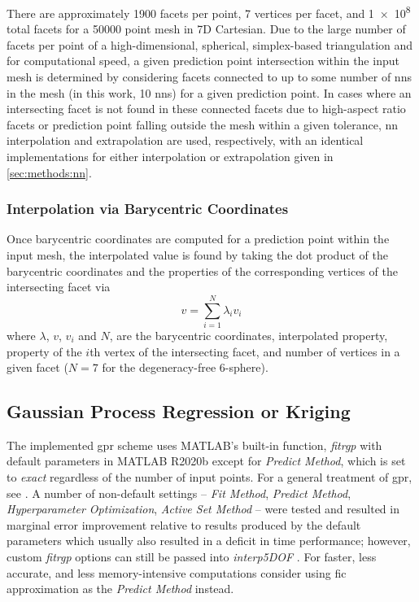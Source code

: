 \documentclass[preprint,12pt]{elsarticle}
\begin{document}
There are approximately 1900 facets per point, 7 vertices per facet, and \num{1e8} total facets for a \num{50000} point mesh in 7D Cartesian. Due to the large number of facets per point of a high-dimensional, spherical, simplex-based triangulation and for computational speed, a given prediction point intersection within the input mesh is determined by considering facets connected to up to some number of \glspl{nn} in the mesh (in this work, 10 \glspl{nn}) for a given prediction point. In cases where an intersecting facet is not found in these connected facets due to high-aspect ratio facets or prediction point falling outside the mesh within a given tolerance, \gls{nn} interpolation and extrapolation are used, respectively, with an identical implementations for either interpolation or extrapolation given in \ref{sec:methods:nn}.

\subsubsection{Interpolation via Barycentric Coordinates}

Once barycentric coordinates are computed for a prediction point within the input mesh, the interpolated value is found by taking the dot product of the barycentric coordinates and the properties of the corresponding vertices of the intersecting facet via
\begin{equation}
v=\underset{i=1}{\overset{N}{\sum }}\lambda _i v_i
\end{equation}
where $\lambda$, $v$, $v_i$ and $N$, are the barycentric coordinates, interpolated property, property of the $i$th vertex of the intersecting facet, and number of vertices in a given facet ($N = 7$ for the degeneracy-free 6-sphere).
    
\subsection{Gaussian Process Regression or Kriging} \label{sec:methods:gpr}

The implemented \gls{gpr} scheme uses MATLAB's built-in function, \textit{fitrgp} with default parameters in MATLAB R2020b except for \textit{Predict Method}, which is set to \textit{exact} regardless of the number of input points. For a general treatment of \gls{gpr}, see \cite{rasmussenGaussianProcessesMachine2006}. A number of non-default settings -- \textit{Fit Method}, \textit{Predict Method}, \textit{Hyperparameter Optimization}, \textit{Active Set Method} -- were tested and resulted in marginal error improvement relative to results produced by the default parameters which usually also resulted in a deficit in time performance; however, custom \textit{fitrgp} options can still be passed into \textit{interp5DOF} \cite{bairdFiveDegreeofFreedom5DOF2020}. For faster, less accurate, and less memory-intensive computations consider using \gls{fic} approximation as the \textit{Predict Method} instead. %
\end{document}
